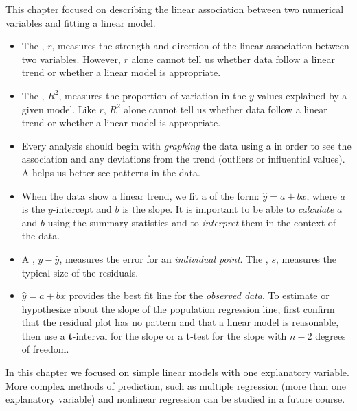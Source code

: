 \noindent This chapter focused on describing the linear association between two numerical variables and fitting a linear model.  
\begin{itemize}
\item The , $r$, measures the strength and direction of the linear association between two variables.  However, $r$ alone cannot tell us whether data follow a linear trend or whether a linear model is appropriate.

\item The , $R^2$, measures the proportion of variation in the $y$ values explained by a given model.  Like $r$, $R^2$ alone cannot tell us whether data follow a linear trend or whether a linear model is appropriate.  

\item Every analysis should begin with \emph{graphing} the data using a  in order to see the association and any deviations from the trend (outliers or influential values).  A  helps us better see patterns in the data.  

\item When the data show a linear trend, we fit a  of the form: $\hat{y} = a+bx$, where $a$ is the $y$-intercept and $b$ is the slope.  It is important to be able to \emph{calculate} $a$ and $b$ using the summary statistics and to \emph{interpret} them in the context of the data.

\item A , $y-\hat{y}$, measures the error for an \emph{individual point}.  The , $s$, measures the typical size of the residuals.  

\item $\hat{y} = a+bx$ provides the best fit line for the \emph{observed data}.  To estimate or hypothesize about the slope of the population regression line, first confirm that the residual plot has no pattern and that a linear model is reasonable, then use a $\pmb{t}$-interval for the slope or a $\pmb{t}$-test for the slope with $n-2$ degrees of freedom.
\end{itemize}
In this chapter we focused on simple linear models with one explanatory variable.  More complex methods of prediction, such as multiple regression (more than one explanatory variable) and nonlinear regression can be studied in a future course.


